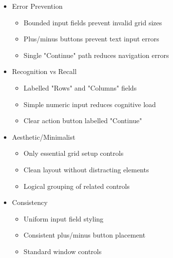     \begin{itemize}
        \item Error Prevention
        \begin{itemize}
            \item Bounded input fields prevent invalid grid sizes
            \item Plus/minus buttons prevent text input errors
            \item Single "Continue" path reduces navigation errors
        \end{itemize}
    \end{itemize}
    
    \begin{itemize}
        \item Recognition vs Recall
    
        \begin{itemize}
            \item Labelled "Rows" and "Columns" fields
            \item Simple numeric input reduces cognitive load
            \item Clear action button labelled "Continue"
        \end{itemize}
    \end{itemize}
    
    
    \begin{itemize}
        \item Aesthetic/Minimalist
    
        \begin{itemize}
            \item Only essential grid setup controls
            \item Clean layout without distracting elements
            \item Logical grouping of related controls
        \end{itemize}
\end{itemize}



\begin{itemize}
    \item Consistency

    \begin{itemize}
        \item Uniform input field styling
        \item Consistent plus/minus button placement
        \item Standard window controls
    \end{itemize}
\end{itemize}


